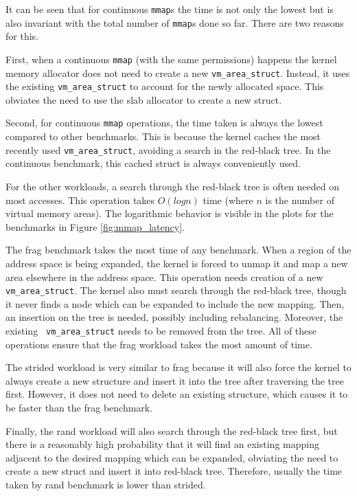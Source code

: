 \documentclass[twocolumn,11pt]{article}
\begin{document}
It can be seen that for continuous \texttt{mmap}s the time is not only the
lowest but is also invariant with the total number of \texttt{mmap}s done so
far. There are two reasons for this. 

First, when a continuous \texttt{mmap} (with the same permissions) happens the
kernel memory allocator does not need to create a new \texttt{vm\_area\_struct}.
Instead, it uses the existing \texttt{vm\_area\_struct} to account for the
newly allocated space. This obviates the need to use the slab allocator to create
a new struct. 

Second, for continuous \texttt{mmap} operations, the time taken is always the
lowest compared to other benchmarks.  This is because the kernel caches the
most recently used \texttt{vm\_area\_struct}, avoiding a search in the
red-black tree. In the continuous benchmark, this cached struct is always
conveniently used.

For the other workloads, a search through the red-black tree is often needed on
most accesses. This operation takes $O(log n)$ time (where $n$ is the number of
virtual memory areas). The logarithmic behavior is visible in the plots for the
benchmarks in Figure \ref{fig:mmap_latency}.

The frag benchmark takes the most time of any benchmark. When a region of the
address space is being expanded, the kernel is forced to unmap it and map a new
area elsewhere in the address space. This operation needs creation of a new
\texttt{vm\_area\_struct}.  The kernel also must search through the red-black
tree, though it never finds a node which can be expanded to include the new
mapping. Then, an insertion on the tree is needed, possibly including
rebalancing. Moreover, the existing \texttt{ vm\_area\_struct} needs to be
removed from the tree. All of these operations ensure that the frag workload
takes the most amount of time.

The strided workload is very similar to frag because it will also force the
kernel to always create a new structure and insert it into the tree after
traversing the tree first. However, it does not need to delete an existing
structure, which causes it to be faster than the frag benchmark.

Finally, the rand workload will also search through the red-black tree first,
but there is a reasonably high probability that it will find an existing
mapping adjacent to the desired mapping which can be expanded, obviating the
need to create a new struct and insert it into red-black tree. Therefore, usually
the time taken by rand benchmark is lower than strided.
\end{document}
